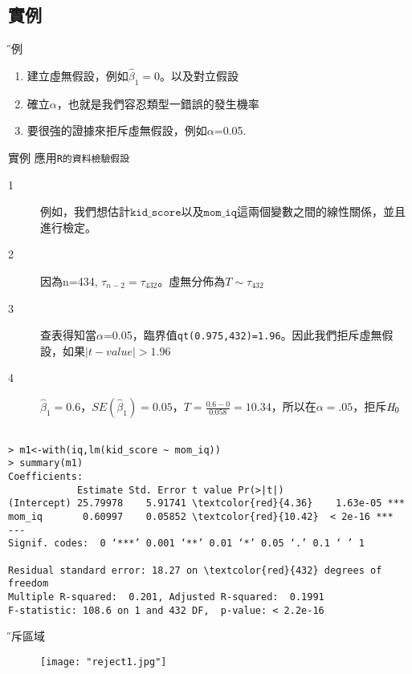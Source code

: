 \documentclass[xcolor=dvipsnames]{beamer}
\begin{document}
\subsection{實例}
\begin{frame}{\H 實例}
\begin{enumerate}
\item 建立虛無假設，例如$\hat{\beta}_{1}=0  $。以及對立假設
\item 確立$\alpha$，也就是我們容忍類型一錯誤的發生機率
\item 要很強的證據來拒斥虛無假設，例如$\alpha$=0.05.
\end{enumerate}
\end{frame}
\begin{frame}{實例}
應用\tt{R}的資料檢驗假設
\begin{description}
\item [1]例如，我們想估計$\mathtt {kid\_score}$以及$\mathtt {mom\_iq}$這兩個變數之間的線性關係，並且進行檢定。
\item [2]因為n=434, $\tau_{n-2}=\tau_{432}$。虛無分佈為$T\sim \tau_{432}$
\item [3] 查表得知當$\alpha$=0.05，臨界值{\tt qt(0.975,432)=1.96}。因此我們拒斥虛無假設，如果$|t-value|>1.96$
\item [4] $\hat{\beta}_{1}=0.6$，$SE(\hat{\beta}_{1})=0.05$，$T=\frac{0.6-0}{0.058}=10.34$，所以在$\alpha=.05$，拒斥$\emph{H}_{0}$
\end{description}
\end{frame}
\begin{frame}[fragile=singleslide]
\begin{Verbatim}[frame=single,label=R code,
fontseries=b,xleftmargin=2mm,commandchars=\\\{\},
formatcom=\color{blue}]

> m1<-with(iq,lm(kid_score ~ mom_iq))
> summary(m1)
Coefficients:
            Estimate Std. Error t value Pr(>|t|)    
(Intercept) 25.79978    5.91741 \textcolor{red}{4.36}    1.63e-05 ***
mom_iq       0.60997    0.05852 \textcolor{red}{10.42}  < 2e-16 ***
---
Signif. codes:  0 ‘***’ 0.001 ‘**’ 0.01 ‘*’ 0.05 ‘.’ 0.1 ‘ ’ 1

Residual standard error: 18.27 on \textcolor{red}{432} degrees of freedom
Multiple R-squared:  0.201,	Adjusted R-squared:  0.1991 
F-statistic: 108.6 on 1 and 432 DF,  p-value: < 2.2e-16
\end{Verbatim}
\end{frame}
\begin{frame}{\H 拒斥區域}
\begin{center}
\begin{figure}
\texttt{[image: "reject1.jpg"]}
\end{figure}
\end{center}
\end{frame}
\end{document}
